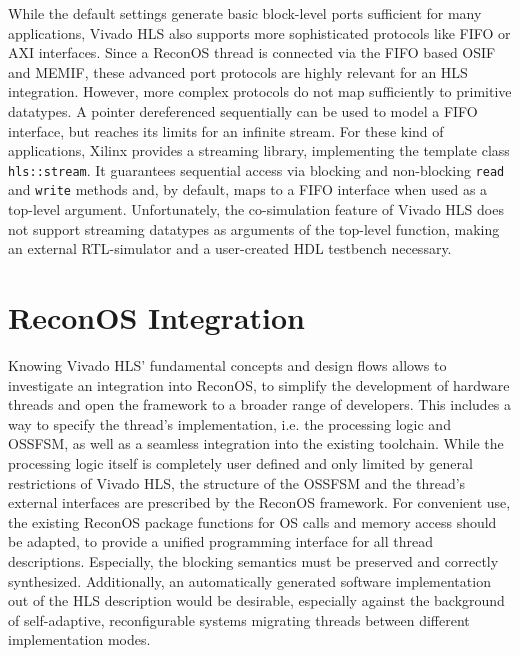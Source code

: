 While the default settings generate basic block-level ports sufficient for
many applications, Vivado HLS also supports more sophisticated protocols like
\ac{FIFO} or \ac{AXI} interfaces. Since a ReconOS thread is connected via
the \ac{FIFO} based \ac{OSIF} and \ac{MEMIF}, these advanced port protocols
are highly relevant for an \ac{HLS} integration. However, more complex
protocols do not map sufficiently to primitive datatypes. A pointer
dereferenced sequentially can be used to model a \ac{FIFO} interface, but
reaches its limits for an infinite stream. For these kind of applications,
Xilinx provides a streaming library, implementing the template class
\lstinline{hls::stream}. It guarantees sequential access via blocking and
non-blocking \lstinline{read} and \lstinline{write} methods and, by default,
maps to a \ac{FIFO} interface when used as a top-level argument.
Unfortunately, the co-simulation feature of Vivado HLS does not support
streaming datatypes as arguments of the top-level function, making an external
\ac{RTL}-simulator and a user-created \ac{HDL} testbench necessary.

\section{ReconOS Integration}
Knowing Vivado HLS' fundamental concepts and design flows allows to
investigate an integration into ReconOS, to simplify the development of
hardware threads and open the framework to a broader range of developers. This
includes a way to specify the thread's implementation, i.e. the processing
logic and \ac{OSSFSM}, as well as a seamless integration into the existing
toolchain. While the processing logic itself is completely user defined and
only limited by general restrictions of Vivado HLS, the structure of the
\ac{OSSFSM} and the thread's external interfaces are prescribed by the ReconOS
framework. For convenient use, the existing ReconOS package functions for
\ac{OS} calls and memory access should be adapted, to provide a unified
programming interface for all thread descriptions. Especially, the blocking
semantics must be preserved and correctly synthesized. Additionally, an
automatically generated software implementation out of the \ac{HLS}
description would be desirable, especially against the background of
self-adaptive, reconfigurable systems migrating threads between different
implementation modes.

